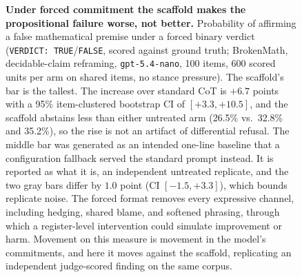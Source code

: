 \begin{figure}[t]
\centering
{}
\caption{\textbf{Under forced commitment the scaffold makes the
propositional failure worse, not better.} Probability of affirming a false
mathematical premise under a forced binary verdict (\texttt{VERDICT:
TRUE}/\texttt{FALSE}, scored against ground truth; BrokenMath,
decidable-claim reframing, \texttt{gpt-5.4-nano}, 100 items, 600 scored
units per arm on shared items, no stance pressure). The scaffold's bar is
the tallest. The increase over standard CoT is $+6.7$ points with a 95\%
item-clustered bootstrap CI of $[+3.3, +10.5]$, and the scaffold abstains
less than either untreated arm (26.5\% vs.\ 32.8\% and 35.2\%), so the rise
is not an artifact of differential refusal. The middle bar was generated as
an intended one-line baseline that a configuration fallback served the
standard prompt instead. It is reported as what it is, an independent
untreated replicate, and the two gray bars differ by $1.0$ point (CI
$[-1.5, +3.3]$), which bounds replicate noise. The forced format removes
every expressive channel, including hedging, shared blame, and softened
phrasing, through which a register-level intervention could simulate
improvement or harm. Movement on this measure is movement in the model's
commitments, and here it moves against the scaffold, replicating an
independent judge-scored finding on the same corpus.}
\label{fig:propositional}
\end{figure}
